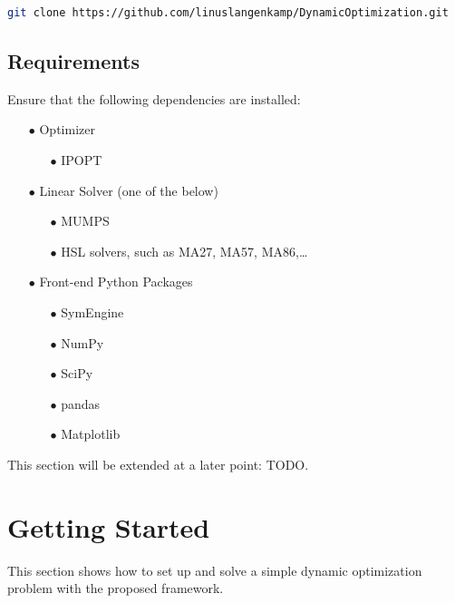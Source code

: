 \documentclass[12pt]{article}
\begin{document}
\begin{lstlisting}[language=bash]
git clone https://github.com/linuslangenkamp/DynamicOptimization.git
\end{lstlisting}

\subsection{Requirements}
Ensure that the following dependencies are installed:
\begin{itemize}
	
	\item[$\bullet$] Optimizer
	\begin{itemize}
		\item[$\bullet$] IPOPT\cite{wachter2006implementation}
	\end{itemize}
	
	\item[$\bullet$] Linear Solver (one of the below)
	\begin{itemize}
		\item[$\bullet$] MUMPS\cite{amestoy2001fully}
		\item[$\bullet$] HSL solvers, such as MA27, MA57, MA86,\ldots\cite{hsl2013collection}
	\end{itemize}
	
	\item[$\bullet$] Front-end Python Packages
	\begin{itemize}
		\item[$\bullet$] SymEngine\cite{symengine}
		\item[$\bullet$] NumPy\cite{harris2020array}
		\item[$\bullet$] SciPy\cite{virtanen2020scipy}
		\item[$\bullet$] pandas\cite{mckinney2010data}
		\item[$\bullet$] Matplotlib\cite{hunter2007matplotlib}
	\end{itemize}
	
\end{itemize}

This section will be extended at a later point: TODO.


\section{Getting Started}
This section shows how to set up and solve a simple dynamic
optimization problem with the proposed framework.
\end{document}
